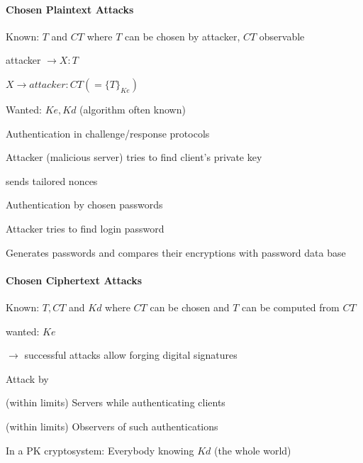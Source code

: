 \documentclass[a4paper]{article}
\begin{document}
\begin{multicols}{3}
    \paragraph{Chosen Plaintext Attacks}
    \begin{itemize*}
        \item Known: $T$ and $CT$ where $T$ can be chosen by attacker, $CT$ observable
        \begin{itemize*}
            \item attacker $\rightarrow X:T$
            \item $X\rightarrow attacker:CT(=\{T\}_{Ke})$
        \end{itemize*}
        \item Wanted: $Ke, Kd$ (algorithm often known)
        \item Authentication in challenge/response protocols
        \begin{itemize*}
            \item Attacker (malicious server) tries to find client’s private key
            \item sends tailored nonces
        \end{itemize*}
        \item Authentication by chosen passwords
        \begin{itemize*}
            \item Attacker tries to find login password
            \item Generates passwords and compares their encryptions with password data base
        \end{itemize*}
    \end{itemize*}

    \paragraph{Chosen Ciphertext Attacks}
    \begin{itemize*}
        \item Known: $T,CT$ and $Kd$ where $CT$ can be chosen and $T$ can be computed from $CT$
        \item wanted: $Ke$
        \item[$\rightarrow$] successful attacks allow forging digital signatures
        \item Attack by
        \begin{itemize*}
            \item (within limits) Servers while authenticating clients
            \item (within limits) Observers of such authentications
            \item In a PK cryptosystem: Everybody knowing $Kd$ (the whole world)
        \end{itemize*}
    \end{itemize*}


\end{multicols}
\end{document}
